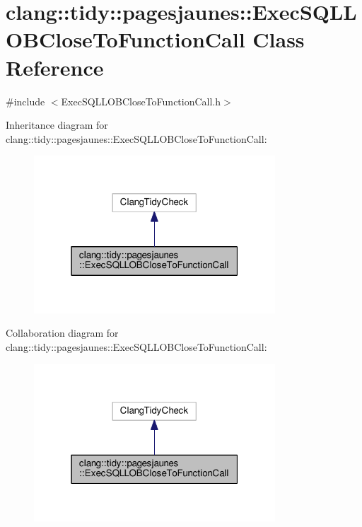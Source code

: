 \hypertarget{classclang_1_1tidy_1_1pagesjaunes_1_1_exec_s_q_l_l_o_b_close_to_function_call}{}\section{clang\+:\+:tidy\+:\+:pagesjaunes\+:\+:Exec\+S\+Q\+L\+L\+O\+B\+Close\+To\+Function\+Call Class Reference}
\label{classclang_1_1tidy_1_1pagesjaunes_1_1_exec_s_q_l_l_o_b_close_to_function_call}


{\ttfamily \#include $<$Exec\+S\+Q\+L\+L\+O\+B\+Close\+To\+Function\+Call.\+h$>$}



Inheritance diagram for clang\+:\+:tidy\+:\+:pagesjaunes\+:\+:Exec\+S\+Q\+L\+L\+O\+B\+Close\+To\+Function\+Call\+:
\nopagebreak
\begin{figure}[H]
\begin{center}
\leavevmode
\includegraphics[width=256pt]{classclang_1_1tidy_1_1pagesjaunes_1_1_exec_s_q_l_l_o_b_close_to_function_call__inherit__graph}
\end{center}
\end{figure}


Collaboration diagram for clang\+:\+:tidy\+:\+:pagesjaunes\+:\+:Exec\+S\+Q\+L\+L\+O\+B\+Close\+To\+Function\+Call\+:
\nopagebreak
\begin{figure}[H]
\begin{center}
\leavevmode
\includegraphics[width=256pt]{classclang_1_1tidy_1_1pagesjaunes_1_1_exec_s_q_l_l_o_b_close_to_function_call__coll__graph}
\end{center}
\end{figure}
